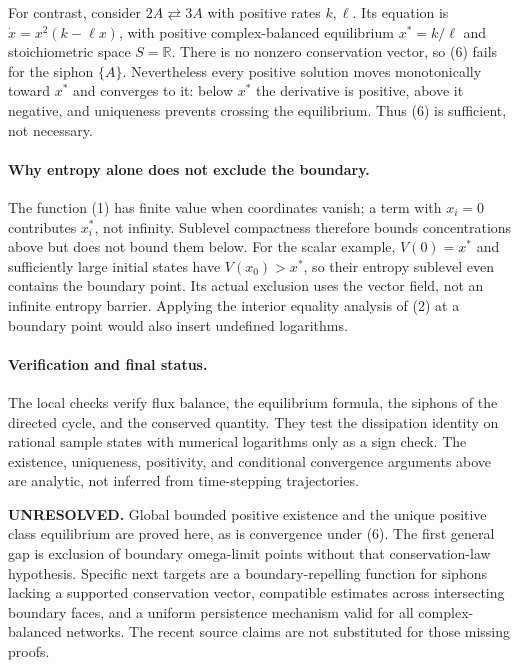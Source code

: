\documentclass[11pt]{article}
\begin{document}
For contrast, consider $2A\rightleftarrows3A$ with positive rates
$k,\ell$. Its equation is $\dot x=x^2(k-\ell x)$, with positive
complex-balanced equilibrium $x^*=k/\ell$ and stoichiometric space
$S=\mathbb R$. There is no nonzero conservation vector, so (6) fails
for the siphon $\{A\}$. Nevertheless every positive solution moves
monotonically toward $x^*$ and converges to it: below $x^*$ the
derivative is positive, above it negative, and uniqueness prevents
crossing the equilibrium. Thus (6) is sufficient, not necessary.

\paragraph{Why entropy alone does not exclude the boundary.}
The function (1) has finite value when coordinates vanish; a term
with $x_i=0$ contributes $x_i^*$, not infinity. Sublevel compactness
therefore bounds concentrations above but does not bound them below.
For the scalar example, $V(0)=x^*$ and sufficiently large initial
states have $V(x_0)>x^*$, so their entropy sublevel even contains the
boundary point. Its actual exclusion uses the vector field, not an
infinite entropy barrier. Applying the interior equality analysis
of (2) at a boundary point would also insert undefined logarithms.

\paragraph{Verification and final status.}
The local checks verify flux balance, the equilibrium formula, the
siphons of the directed cycle, and the conserved quantity. They test
the dissipation identity on rational sample states with numerical
logarithms only as a sign check. The existence, uniqueness, positivity,
and conditional convergence arguments above are analytic, not inferred
from time-stepping trajectories.

\textbf{UNRESOLVED.} Global bounded positive existence and the unique
positive class equilibrium are proved here, as is convergence under
(6). The first general gap is exclusion of boundary omega-limit points
without that conservation-law hypothesis. Specific next targets are a
boundary-repelling function for siphons lacking a supported conservation
vector, compatible estimates across intersecting boundary faces, and a
uniform persistence mechanism valid for all complex-balanced networks.
The recent source claims are not substituted for those missing proofs.
\end{document}
